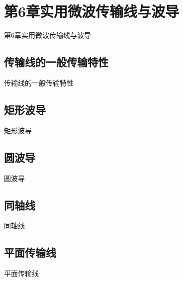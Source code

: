 \section{第6章\quad 实用微波传输线与波导}
\begin{frame}{第6章\quad 实用微波传输线与波导}

\end{frame}

\subsection{传输线的一般传输特性}
\begin{frame}{传输线的一般传输特性}

\end{frame}

\subsection{矩形波导}
\begin{frame}{矩形波导}

\end{frame}

\subsection{圆波导}
\begin{frame}{圆波导}

\end{frame}

\subsection{同轴线}
\begin{frame}{同轴线}

\end{frame}

\subsection{平面传输线}
\begin{frame}{平面传输线}

\end{frame}






